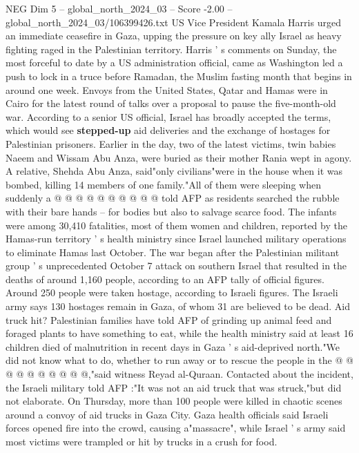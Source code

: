 \begin{textsample}{NEG Dim 5 – global\_north\_2024\_03 – Score -2.00 – global\_north\_2024\_03/106399426.txt}  \label{ex:f5_neg_081}
US Vice President Kamala Harris urged an immediate ceasefire in Gaza, upping the pressure on key ally Israel as heavy fighting raged in the Palestinian territory.
Harris ' s comments on Sunday, the most forceful to date by a US administration official, came as Washington led a push to lock in a truce before Ramadan, the Muslim fasting month that begins in around one week.
Envoys from the United States, Qatar and Hamas were in Cairo for the latest round of talks over a proposal to pause the five-month-old war.
According to a senior US official, Israel has broadly accepted the terms, which would see \textbf{stepped-up} aid deliveries and the exchange of hostages for Palestinian prisoners.
Earlier in the day, two of the latest victims, twin babies Naeem and Wissam Abu Anza, were buried as their mother Rania wept in agony.
A relative, Shehda Abu Anza, said"only civilians"were in the house when it was bombed, killing 14 members of one family."All of them were sleeping when suddenly a @ @ @ @ @ @ @ @ @ @ told AFP as residents searched the rubble with their bare hands -- for bodies but also to salvage scarce food.
The infants were among 30,410 fatalities, most of them women and children, reported by the Hamas-run territory ' s health ministry since Israel launched military operations to eliminate Hamas last October.
The war began after the Palestinian militant group ' s unprecedented October 7 attack on southern Israel that resulted in the deaths of around 1,160 people, according to an AFP tally of official figures.
Around 250 people were taken hostage, according to Israeli figures.
The Israeli army says 130 hostages remain in Gaza, of whom 31 are believed to be dead.
Aid truck hit?
Palestinian families have told AFP of grinding up animal feed and foraged plants to have something to eat, while the health ministry said at least 16 children died of malnutrition in recent days in Gaza ' s aid-deprived north."We did not know what to do, whether to run away or to rescue the people in the @ @ @ @ @ @ @ @ @ @,"said witness Reyad al-Quraan.
Contacted about the incident, the Israeli military told AFP :"It was not an aid truck that was struck,"but did not elaborate.
On Thursday, more than 100 people were killed in chaotic scenes around a convoy of aid trucks in Gaza City.
Gaza health officials said Israeli forces opened fire into the crowd, causing a"massacre", while Israel ' s army said most victims were trampled or hit by trucks in a crush for food.

\end{textsample}
